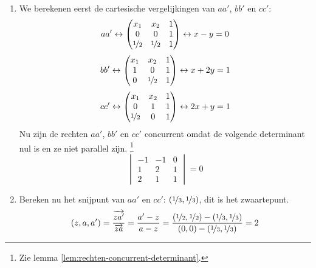 \documentclass[main.tex]{subfiles}
\begin{document}
\begin{enumerate}
\item
  We berekenen eerst de cartesische vergelijkingen van $aa'$, $bb'$ en $cc'$:
  \[
  aa' \leftrightarrow
  \begin{pmatrix}
    x_{1} & x_{2} & 1\\
    0 & 0 & 1\\
    \nicefrac{1}{2} & \nicefrac{1}{2} & 1\\
  \end{pmatrix}
  \leftrightarrow
  x-y = 0
  \]
  \[
  bb' \leftrightarrow
  \begin{pmatrix}
    x_{1} & x_{2} & 1\\
    1 & 0 & 1\\
    0 & \nicefrac{1}{2} & 1\\
  \end{pmatrix}
  \leftrightarrow
  x+2y = 1
  \]
  \[
  cc' \leftrightarrow
  \begin{pmatrix}
    x_{1} & x_{2} & 1\\
    0 & 1 & 1\\
    \nicefrac{1}{2} &0 & 1\\
  \end{pmatrix}
  \leftrightarrow
  2x+y = 1
  \]
  Nu zijn de rechten $aa'$, $bb'$ en $cc'$ concurrent omdat de volgende determinant nul is en ze niet parallel zijn. \footnote{Zie lemma \ref{lem:rechten-concurrent-determinant}.}
  \[
  \begin{vmatrix}
    -1 & -1 & 0\\
    1 & 2 & 1\\
    2 & 1 & 1
  \end{vmatrix}
  =0
  \]
\item Bereken nu het snijpunt van $aa'$ en $cc'$: $(\nicefrac{1}{3},\nicefrac{1}{3})$, dit is het zwaartepunt.
  \[ (z,a,a') = \frac{\overrightarrow{za'}}{\overrightarrow{za}} =\frac{a'-z}{a-z} = \frac{(\nicefrac{1}{2}, \nicefrac{1}{2})-(\nicefrac{1}{3},\nicefrac{1}{3})}{(0,0)-(\nicefrac{1}{3},\nicefrac{1}{3})} = 2\]
\end{enumerate}
\end{document}
